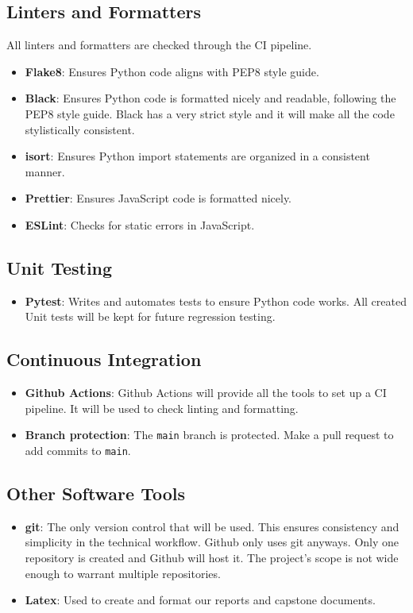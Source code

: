 \documentclass{article}
\begin{document}
\subsection{Linters and Formatters}
All linters and formatters are checked through the CI pipeline.
\begin{itemize}
  \item \textbf{Flake8}: Ensures Python code aligns with PEP8 style guide.
  \item \textbf{Black}: Ensures Python code is formatted nicely and readable, following the PEP8
    style guide. Black has a very strict style and it will make all the code stylistically 
    consistent.
  \item \textbf{isort}: Ensures Python import statements are organized in a consistent manner.
  \item \textbf{Prettier}: Ensures JavaScript code is formatted nicely.
  \item \textbf{ESLint}: Checks for static errors in JavaScript.
\end{itemize}

\subsection{Unit Testing}
\begin{itemize}
  \item \textbf{Pytest}: Writes and automates tests to ensure Python code works. All created Unit tests will be kept for future regression testing.
\end{itemize}

\subsection{Continuous Integration}
\begin{itemize}
  \item \textbf{Github Actions}: Github Actions will provide all the tools to set up a CI pipeline.
    It will be used to check linting and formatting.
  \item \textbf{Branch protection}: The \verb|main| branch is protected. Make a pull request to
    add commits to \verb|main|.
\end{itemize}

\subsection{Other Software Tools}
\begin{itemize}
  \item \textbf{git}: The only version control that will be used. This ensures consistency and
  simplicity in the technical workflow. Github only uses git anyways. Only one repository is 
  created and Github will host it. The project's scope is not wide enough to warrant multiple 
  repositories.
  \item \textbf{Latex}: Used to create and format our reports and capstone documents.
\end{itemize}
\end{document}
